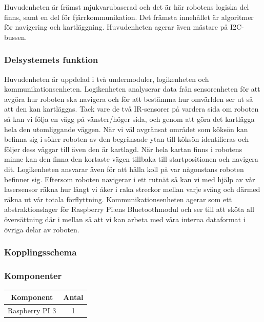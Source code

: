 \documentclass{article}
\begin{document}
Huvudenheten är främst mjukvarubaserad och det är här robotens logiska del finns, samt en del för fjärrkommunikation. Det främsta innehållet är algoritmer för navigering och kartläggning. Huvudenheten agerar även mästare på I2C-bussen.

\subsubsection{Delsystemets funktion}

Huvudenheten är uppdelad i två undermoduler, logikenheten och kommunikationsenheten. Logikenheten analyserar data från sensorenheten för att avgöra hur roboten ska navigera och för att bestämma hur omvärlden ser ut så att den kan kartläggas. Tack vare de två IR-sensorer på vardera sida om roboten så kan vi följa en vägg på vänster/höger sida, och genom att göra det kartlägga hela den utomliggande väggen. När vi väl avgränsat området som köksön kan befinna sig i söker roboten av den begränsade ytan till köksön identifieras och följer dess väggar till även den är kartlagd. När hela kartan finns i robotens minne kan den finna den kortaste vägen tillbaka till startpositionen och navigera dit. Logikenheten ansvarar även för att hålla koll på var någonstans roboten befinner sig. Eftersom roboten navigerar i ett rutnät så kan vi med hjälp av vår lasersensor räkna hur långt vi åker i raka streckor mellan varje sväng och därmed räkna ut vår totala förflyttning. Kommunikationsenheten agerar som ett abstraktionslager för Raspberry Pi:ens Bluetoothmodul och ser till att sköta all översättning där i mellan så att vi kan arbeta med våra interna dataformat i övriga delar av roboten.


\subsubsection{Kopplingsschema}

\subsubsection{Komponenter}

\begin{table}[H]
   \centering
  \begin{tabular}{ | c | c | }
    \hline
    \textbf{Komponent} & \textbf{Antal} \\
    \hline
    Raspberry PI 3 & 1 \\
    \hline
  \end{tabular}
\end{table}
\end{document}
